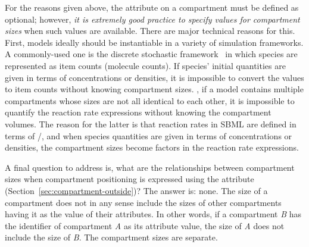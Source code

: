 For the reasons given above, the  attribute on a
compartment must be defined as optional; however, \emph{it is
  extremely good practice to specify values for compartment sizes}
when such values are available.  There are  major
technical reasons for this.  First,  models
ideally should be instantiable in a variety of simulation
frameworks.  A commonly-used one is the discrete stochastic
framework~\citep{gillespie:1977,wilkinson_2006} in which species
are represented as item counts (\eg molecule counts).  If species'
initial quantities are given in terms of concentrations or
densities, it is impossible to convert the values to item counts
without knowing compartment sizes.  ,
if a model contains multiple compartments whose sizes are not all
identical to each other, it is impossible to quantify the reaction
rate expressions without knowing the compartment volumes.  The
reason for the latter is  that reaction rates in SBML are defined
in terms of /, and when species quantities are
given in terms of concentrations or densities, the compartment
sizes become factors in the reaction rate expressions.

\begin{blockChanged}

A final question to address is, what are the relationships between
compartment sizes when compartment positioning is expressed using
the  attribute
(Section~\ref{sec:compartment-outside})?  The answer is: none.
The size of a  compartment does not in any sense include the
sizes of other compartments having it as the value of their
 attributes.  In other words, if a compartment
\emph{B} has the identifier of compartment \emph{A} as its
 attribute value, the size of \emph{A} does not
include the size of \emph{B}.  The compartment sizes are separate.

\end{blockChanged}


